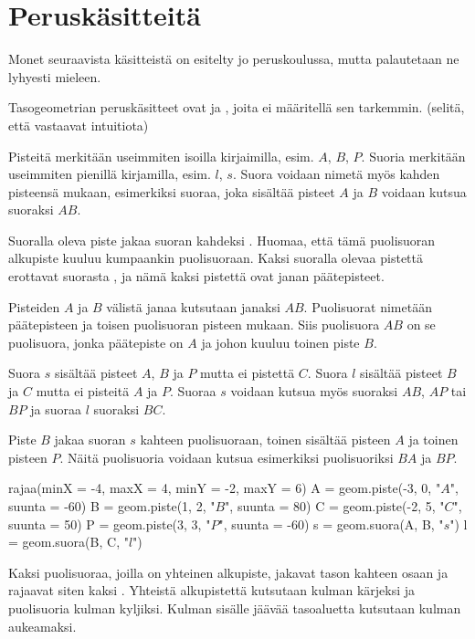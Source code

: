 \section*{Peruskäsitteitä}

Monet seuraavista käsitteistä on esitelty jo peruskoulussa, mutta palautetaan ne lyhyesti
mieleen.

Tasogeometrian peruskäsitteet ovat  ja , joita ei
määritellä sen tarkemmin. (selitä, että vastaavat intuitiota)

Pisteitä merkitään useimmiten isoilla kirjaimilla, esim. $A$, $B$, $P$. Suoria merkitään useimmiten pienillä kirjamilla, esim. $l$, $s$. Suora voidaan nimetä myös kahden pisteensä mukaan, esimerkiksi suoraa, joka sisältää pisteet $A$ ja $B$ voidaan kutsua suoraksi $AB$.

Suoralla oleva piste jakaa suoran kahdeksi . Huomaa, että tämä puolisuoran
alkupiste kuuluu kumpaankin puolisuoraan. Kaksi suoralla olevaa pistettä erottavat suorasta
, ja nämä kaksi pistettä ovat janan päätepisteet.

Pisteiden $A$ ja $B$ välistä janaa kutsutaan janaksi $AB$. Puolisuorat nimetään päätepisteen ja toisen puolisuoran pisteen mukaan. Siis puolisuora $AB$ on se puolisuora, jonka päätepiste on $A$ ja johon kuuluu toinen piste $B$.

\begin{esimerkki}
Suora $s$ sisältää pisteet $A$, $B$ ja $P$ mutta ei pistettä $C$. Suora $l$ sisältää pisteet $B$ ja $C$ mutta ei pisteitä $A$ ja $P$. Suoraa $s$ voidaan kutsua myös suoraksi $AB$, $AP$ tai $BP$ ja suoraa $l$ suoraksi $BC$.

Piste $B$ jakaa suoran $s$ kahteen puolisuoraan, toinen sisältää pisteen $A$ ja toinen pisteen $P$. Näitä puolisuoria voidaan kutsua esimerkiksi puolisuoriksi $BA$ ja $BP$.

\begin{center}
\begin{kuva}
	rajaa(minX = -4, maxX = 4, minY = -2, maxY = 6)
	A = geom.piste(-3, 0, "$A$", suunta = -60)
	B = geom.piste(1, 2, "$B$", suunta = 80)
	C = geom.piste(-2, 5, "$C$", suunta = 50)
	P = geom.piste(3, 3, "$P$", suunta = -60)
	s = geom.suora(A, B, "$s$")
	l = geom.suora(B, C, "$l$")
\end{kuva}
\end{center}
\end{esimerkki}

Kaksi puolisuoraa, joilla on yhteinen alkupiste, jakavat tason kahteen osaan ja rajaavat siten kaksi . Yhteistä alkupistettä
kutsutaan kulman kärjeksi ja puolisuoria kulman kyljiksi. Kulman sisälle jäävää tasoaluetta
kutsutaan kulman aukeamaksi.

